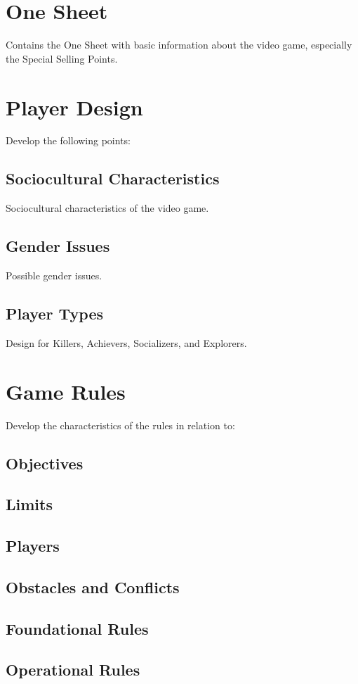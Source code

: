 \section{One Sheet}
Contains the One Sheet with basic information about the video game, especially the Special Selling Points.

\section{Player Design}
Develop the following points:
    \subsection{Sociocultural Characteristics}
    Sociocultural characteristics of the video game.
    \subsection{Gender Issues}
    Possible gender issues.
    \subsection{Player Types}
    Design for Killers, Achievers, Socializers, and Explorers.

\section{Game Rules}
Develop the characteristics of the rules in relation to:
    \subsection{Objectives}
    \subsection{Limits}
    \subsection{Players}
    \subsection{Obstacles and Conflicts}
    \subsection{Foundational Rules}
    \subsection{Operational Rules}
